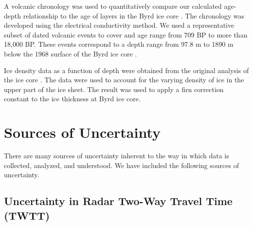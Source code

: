 \documentclass[jgrga]{agutex}
\begin{document}
\begin{article}
A volcanic chronology was used to quantitatively compare our calculated age-depth relationship to the age of layers in the Byrd ice core \citep{hammer1994}. The chronology was developed using the electrical conductivity method. We used a representative subset of dated volcanic events to cover and age range from 709 BP to more than 18,000 BP. These events correspond to a depth range from 97.8 m to 1890 m below the 1968 surface of the Byrd ice core \citep{gow1968}.

Ice density data as a function of depth were obtained from the original analysis of the ice core \citep{gow1968}. The data were used to account for the varying density of ice in the upper part of the ice sheet. The result was used to apply a firn correction constant to the ice thickness at Byrd ice core. 





\section{Sources of Uncertainty}\label{unc}
There are many sources of uncertainty inherent to the way in which
data is collected, analyzed, and understood. We have included the
following sources of uncertainty.

\subsection{Uncertainty in Radar Two-Way Travel Time (TWTT)}




\end{article}
\end{document}
